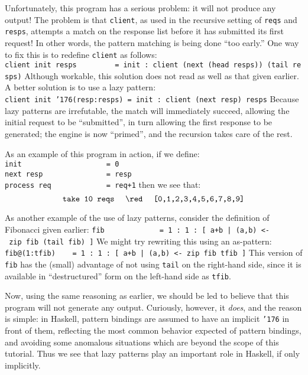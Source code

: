 Unfortunately, this program has a serious problem: it will not produce
any output!  The problem is that \mbox{\tt client}, as used in the recursive
setting of \mbox{\tt reqs} and \mbox{\tt resps}, attempts a match on the response list
before it has submitted its first request!  In other words, the
pattern matching is being done ``too early.''  One way to fix this is
to redefine \mbox{\tt client} as follows:
\bprog
\mbox{\tt client\ init\ resps\ \ \ \ \ \ \ \ \ =\ init\ :\ client\ (next\ (head\ resps))\ (tail\ resps)}
\eprog 
Although workable, this solution does not read as well as that given
earlier.  A better solution is to use a lazy pattern:
\bprog
\mbox{\tt client\ init\ {\char'176}(resp:resps)\ =\ init\ :\ client\ (next\ resp)\ resps}
\eprog 
Because lazy patterns are irrefutable, the match will immediately
succeed, allowing the initial request to be ``submitted'', in turn
allowing the first response to be generated; the engine is now
``primed'', and the recursion takes care of the rest.

As an example of this program in action, if we define:
\bprog
\mbox{\tt init\ \ \ \ \ \ \ \ \ \ \ \ \ \ \ \ \ \ \ \ =\ 0}\\
\mbox{\tt next\ resp\ \ \ \ \ \ \ \ \ \ \ \ \ \ \ =\ resp}\\
\mbox{\tt process\ req\ \ \ \ \ \ \ \ \ \ \ \ \ =\ req+1}
\eprog 
then we see that:
\[ \mbox{\tt take\ 10\ reqs}\ \ \ \ \red\ \ \ \ \mbox{\tt [0,1,2,3,4,5,6,7,8,9]} \]

As another example of the use of lazy patterns, consider the
definition of Fibonacci given earlier:
\bprog
\mbox{\tt fib\ \ \ \ \ \ \ \ \ \ \ \ \ =\ 1\ :\ 1\ :\ [\ a+b\ |\ (a,b)\ <-\ zip\ fib\ (tail\ fib)\ ]}
\eprog 
We might try rewriting this using an as-pattern:
\bprog
\mbox{\tt fib@(1:tfib)\ \ \ \ =\ 1\ :\ 1\ :\ [\ a+b\ |\ (a,b)\ <-\ zip\ fib\ tfib\ ]}
\eprog 
This version of \mbox{\tt fib} has the (small) advantage of not using \mbox{\tt tail} on
the right-hand side, since it is available in ``destructured'' form on
the left-hand side as \mbox{\tt tfib}.


Now, using the same reasoning as earlier, we should be led to
believe that this program will not generate any output.  Curiously,
however, it {\em does}, and the reason is simple: in Haskell,
pattern bindings are assumed to have an implicit \mbox{\tt {\char'176}} in front of them,
reflecting the most common behavior expected of pattern bindings, and
avoiding some anomalous situations which are beyond the scope of this
tutorial.  Thus we see that lazy patterns play an important role in
Haskell, if only implicitly.

